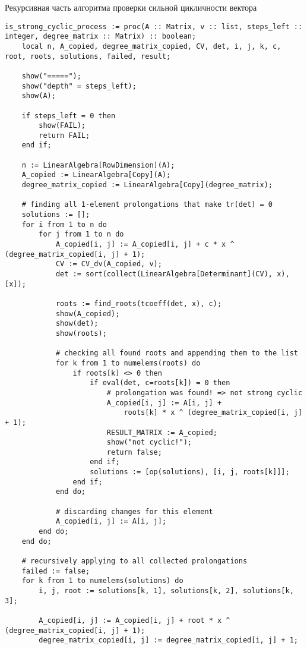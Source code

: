 Рекурсивная часть алгоритма проверки сильной цикличности вектора
\begin{lstlisting}[basicstyle=\scriptsize]
is_strong_cyclic_process := proc(A :: Matrix, v :: list, steps_left :: integer, degree_matrix :: Matrix) :: boolean;
    local n, A_copied, degree_matrix_copied, CV, det, i, j, k, c, root, roots, solutions, failed, result;

    show("=====");
    show("depth" = steps_left);
    show(A);
    
    if steps_left = 0 then
        show(FAIL);
        return FAIL;
    end if;
    
    n := LinearAlgebra[RowDimension](A);
    A_copied := LinearAlgebra[Copy](A);
    degree_matrix_copied := LinearAlgebra[Copy](degree_matrix);
    
    # finding all 1-element prolongations that make tr(det) = 0
    solutions := [];
    for i from 1 to n do
        for j from 1 to n do
            A_copied[i, j] := A_copied[i, j] + c * x ^ (degree_matrix_copied[i, j] + 1);
            CV := CV_dv(A_copied, v);
            det := sort(collect(LinearAlgebra[Determinant](CV), x), [x]);
            
            roots := find_roots(tcoeff(det, x), c);
            show(A_copied);
            show(det);
            show(roots);
            
            # checking all found roots and appending them to the list
            for k from 1 to numelems(roots) do
                if roots[k] <> 0 then
                    if eval(det, c=roots[k]) = 0 then
                        # prolongation was found! => not strong cyclic
                        A_copied[i, j] := A[i, j] +
                            roots[k] * x ^ (degree_matrix_copied[i, j] + 1);
                        RESULT_MATRIX := A_copied;
                        show("not cyclic!");
                        return false;
                    end if;
                    solutions := [op(solutions), [i, j, roots[k]]];
                end if;
            end do;
            
            # discarding changes for this element
            A_copied[i, j] := A[i, j];
        end do;
    end do;
    
    # recursively applying to all collected prolongations
    failed := false;
    for k from 1 to numelems(solutions) do
        i, j, root := solutions[k, 1], solutions[k, 2], solutions[k, 3];
        
        A_copied[i, j] := A_copied[i, j] + root * x ^ (degree_matrix_copied[i, j] + 1);
        degree_matrix_copied[i, j] := degree_matrix_copied[i, j] + 1;
        

\end{lstlisting}
